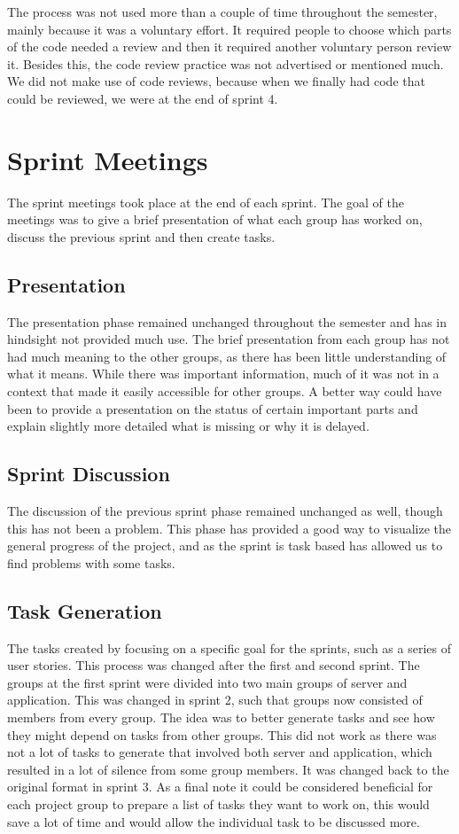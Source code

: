 The process was not used more than a couple of time throughout the semester,
mainly because it was a voluntary effort. It required people to choose
which parts of the code needed a review and then it required another voluntary
person review it. Besides this, the code review practice was not advertised or
mentioned much.\\
We did not make use of code reviews, because when we finally had code that could
be reviewed, we were at the end of sprint 4.

\section{Sprint Meetings}
The sprint meetings took place at the end of each sprint. The goal of the
meetings was to give a brief presentation of what each group has worked on,
discuss the previous sprint and then create tasks.\nl

\subsection{Presentation}
The presentation phase remained unchanged throughout the semester and has in
hindsight not provided much use. The brief presentation from each group has not
had much meaning to the other groups, as there has been little understanding of
what it means. While there was important information, much of it was not in a
context that made it easily accessible for other groups. A better way could have
been to provide a presentation on the status of certain important parts and
explain slightly more detailed what is missing or why it is delayed.\nl

\subsection{Sprint Discussion}
The discussion of the previous sprint phase remained unchanged as well,
though this has not been a problem. This phase has provided a good way to
visualize the general progress of the project, and as the sprint is task based
has allowed us to find problems with some tasks.\nl

\subsection{Task Generation}
The tasks created by focusing on a specific goal for the sprints, such as a
series of user stories. This process was changed after the first and second
sprint. The groups at the first sprint were divided into two main groups of
server and application. This was changed in sprint 2, such that groups now
consisted of members from every group. The idea was to better generate tasks and
see how they might depend on tasks from other groups. This did not work as there
was not a lot of tasks to generate that involved both server and application, which
resulted in a lot of silence from some group members. It was changed back to the
original format in sprint 3. As a final note it could be considered beneficial
for each project group to prepare a list of tasks they want to work on, this
would save a lot of time and would allow the individual task to be discussed
more.

